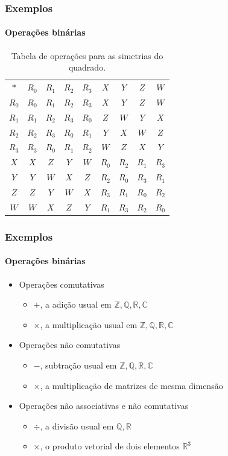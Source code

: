 \documentclass[12pt]{beamer}
\begin{document}
\begin{frame}
  \frametitle{Exemplos}
  \framesubtitle{Operações binárias}
  \begin{table}
    \begin{tabular}{ccccccccc}
      $*$ & $R_{0}$ & $R_{1}$ & $R_{2}$ & $R_{3}$ & $X$ & $Y$ & $Z$ & $W$ \\
      $R_{0}$ & $R_{0}$ & $R_{1}$ & $R_{2}$ & $R_{3}$ & $X$ & $Y$ & $Z$ & $W$
        \\
      $R_{1}$ & $R_{1}$ & $R_{2}$ & $R_{3}$ & $R_{0}$ & $Z$ & $W$ & $Y$ & $X$
        \\
      $R_{2}$ & $R_{2}$ & $R_{3}$ & $R_{0}$ & $R_{1}$ & $Y$ & $X$ & $W$ & $Z$
        \\
      $R_{3}$ & $R_{3}$ & $R_{0}$ & $R_{1}$ & $R_{2}$ & $W$ & $Z$ & $X$ & $Y$
        \\
      $X$ & $X$ & $Z$ & $Y$ & $W$ & $R_{0}$ & $R_{2}$ & $R_{1}$ & $R_{3}$ \\
      $Y$ & $Y$ & $W$ & $X$ & $Z$ & $R_{2}$ & $R_{0}$ & $R_{3}$ & $R_{1}$ \\
      $Z$ & $Z$ & $Y$ & $W$ & $X$ & $R_{3}$ & $R_{1}$ & $R_{0}$ & $R_{2}$ \\
      $W$ & $W$ & $X$ & $Z$ & $Y$ & $R_{1}$ & $R_{3}$ & $R_{2}$ & $R_{0}$ \\
    \end{tabular}
    \caption*{Tabela de operações para as simetrias do quadrado.}
  \end{table}
\end{frame}

\begin{frame}
  \frametitle{Exemplos}
  \framesubtitle{Operações binárias}
  \begin{itemize}
    \item<1-> Operações comutativas
    \begin{itemize}[itemsep=0pt]
      \item<2-> $+$, a adição usual em $\mathbb{Z}, \mathbb{Q}, \mathbb{R},
          \mathbb{C}$
      \item<3-> $\times$, a multiplicação usual em $\mathbb{Z}, \mathbb{Q},
          \mathbb{R}, \mathbb{C}$
    \end{itemize}
    \item<1-> Operações não comutativas
    \begin{itemize}[itemsep=0pt]
      \item<4-> $-$, subtração usual em $\mathbb{Z}, \mathbb{Q}, \mathbb{R},
          \mathbb{C}$
      \item<5-> $\times$, a multiplicação de matrizes de mesma dimensão
    \end{itemize}
    \item<1-> Operações não associativas e não comutativas
    \begin{itemize}[itemsep=0pt]
      \item<6-> $\div$, a divisão usual em $\mathbb{Q}, \mathbb{R}$
      \item<7-> $\times$, o produto vetorial de dois elementos $\mathbb{R}^{3}$
    \end{itemize}
  \end{itemize}
\end{frame}
\end{document}
